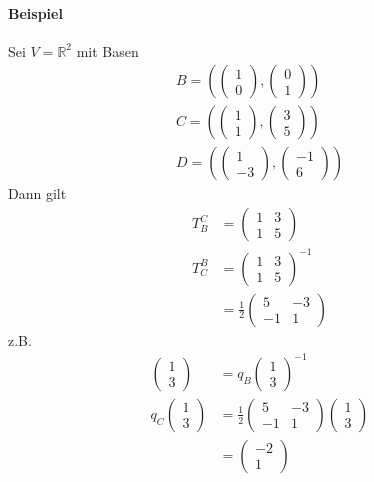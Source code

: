 \documentclass[11pt]{report}
\newcommand*\Zb[1] {\mathbb{#1}}
\begin{document}
\paragraph{Beispiel}
Sei $V= \Zb{R}^2$ mit Basen
\begin{align}
B = \left( \begin{pmatrix} 1 \\ 0 \end{pmatrix}, \begin{pmatrix} 0 \\ 1 \end{pmatrix} \right) \\
C = \left( \begin{pmatrix} 1 \\ 1 \end{pmatrix}, \begin{pmatrix} 3 \\ 5 \end{pmatrix} \right) \\
D = \left( \begin{pmatrix} 1 \\ -3 \end{pmatrix}, \begin{pmatrix} -1 \\ 6 \end{pmatrix} \right) 
\end{align}
Dann gilt
\begin{align}
T_{B}^{C} &= \begin{pmatrix} 1 & 3 \\ 1 & 5 \end{pmatrix} \\
T_{C}^{B} &= \begin{pmatrix} 1 & 3 \\ 1 & 5 \end{pmatrix}^{-1} \\
&= \frac{1}{2}\begin{pmatrix} 5 & -3 \\ -1 & 1 \end{pmatrix}
\end{align}
z.B.
\begin{align}
\begin{pmatrix} 1 \\ 3 \end{pmatrix} &= q_B \begin{pmatrix} 1 \\ 3 \end{pmatrix}^{-1} \\
q_C \begin{pmatrix} 1 \\ 3 \end{pmatrix} &= \frac{1}{2} \begin{pmatrix} 5 & -3 \\ -1 & 1 \end{pmatrix} \begin{pmatrix} 1 \\ 3 \end{pmatrix} \\
&= \begin{pmatrix} -2 \\ 1\end{pmatrix}
\end{align}
\end{document}
